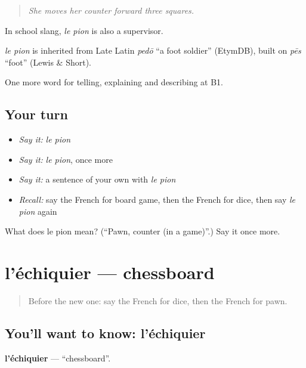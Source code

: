 \begin{quote}
\emph{She moves her counter forward three squares.}
\end{quote}

In school slang, \emph{le pion} is also a supervisor.

\begin{cousinweb}
\emph{le pion} is inherited from Late Latin \emph{pedō} \textquotedblleft{}a foot soldier\textquotedblright{} (EtymDB), built on \emph{pēs} \textquotedblleft{}foot\textquotedblright{} (Lewis \& Short).
\end{cousinweb}

\begin{grammarlens}[title={What you've built}]
One more word for telling, explaining and describing at B1.
\end{grammarlens}

\subsection*{Your turn}
\begin{itemize}
\raggedright
  \item \emph{Say it:} \emph{le pion}
  \item \emph{Say it:} \emph{le pion}, once more
  \item \emph{Say it:} a sentence of your own with \emph{le pion}
  \item \emph{Recall:} say the French for board game, then the French for dice, then say \emph{le pion} again
\end{itemize}

\begin{tcolorbox}[breakable,colback=teal!4,colframe=teal!35!black,title={Before you move on}]
What does le pion mean? (\textquotedblleft{}Pawn, counter (in a game)\textquotedblright{}.) Say it once more.
\end{tcolorbox}
\section[l'échiquier]{l'échiquier — chessboard}

\label{lesson:FR-C499-echiquier}



\begin{quote}
Before the new one: say the French for dice, then the French for pawn.
\end{quote}

\subsection*{You'll want to know: l'échiquier}
\textbf{l'échiquier} — \textquotedblleft{}chessboard\textquotedblright{}.

